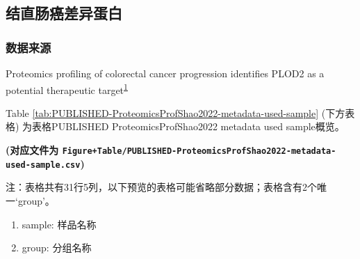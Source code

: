 \documentclass[
]{article}
\providecommand{\tightlist}{%
  \setlength{\itemsep}{0pt}\setlength{\parskip}{0pt}}
\begin{document}
\hypertarget{ux7ed3ux76f4ux80a0ux764cux5deeux5f02ux86cbux767d}{%
\subsection{结直肠癌差异蛋白}\label{ux7ed3ux76f4ux80a0ux764cux5deeux5f02ux86cbux767d}}

\hypertarget{ux6570ux636eux6765ux6e90}{%
\subsubsection{数据来源}\label{ux6570ux636eux6765ux6e90}}

Proteomics profiling of colorectal cancer progression identifies PLOD2 as a potential therapeutic target\textsuperscript{\protect\hyperlink{ref-ProteomicsProfShao2022}{1}}

Table \ref{tab:PUBLISHED-ProteomicsProfShao2022-metadata-used-sample} (下方表格) 为表格PUBLISHED ProteomicsProfShao2022 metadata used sample概览。

\textbf{(对应文件为 \texttt{Figure+Table/PUBLISHED-ProteomicsProfShao2022-metadata-used-sample.csv})}

\begin{center}\begin{tcolorbox}[colback=gray!10, colframe=gray!50, width=0.9\linewidth, arc=1mm, boxrule=0.5pt]注：表格共有31行5列，以下预览的表格可能省略部分数据；表格含有2个唯一`group'。
\end{tcolorbox}
\end{center}
\begin{center}\begin{tcolorbox}[colback=gray!10, colframe=gray!50, width=0.9\linewidth, arc=1mm, boxrule=0.5pt]\begin{enumerate}\tightlist
\item sample:  样品名称
\item group:  分组名称
\end{enumerate}\end{tcolorbox}
\end{center}
\end{document}
